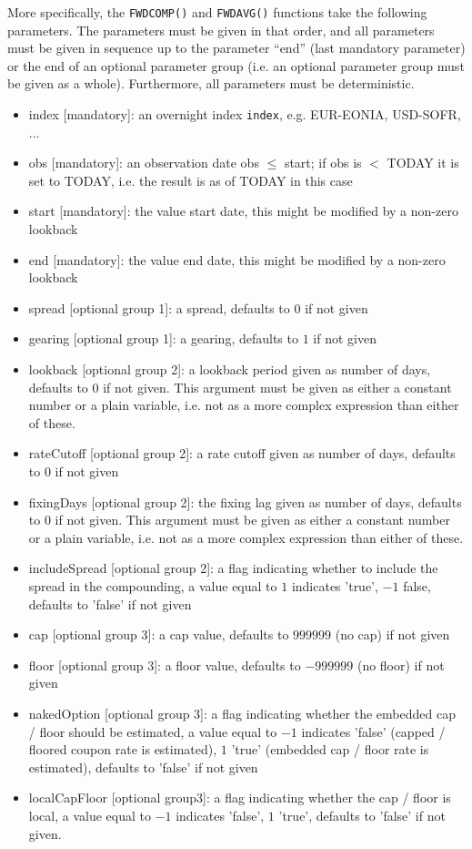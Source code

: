 More specifically, the {\tt FWDCOMP()} and {\tt FWDAVG()} functions take the following parameters. The parameters must
be given in that order, and all parameters must be given in sequence up to the parameter ``end'' (last mandatory
parameter) or the end of an optional parameter group (i.e. an optional parameter group must be given as a
whole). Furthermore, all parameters must be deterministic.

\begin{itemize}
\item index [mandatory]: an overnight index \verb+index+, e.g. EUR-EONIA, USD-SOFR, ...
\item obs [mandatory]: an observation date obs $\leq$ start; if obs is $<$ TODAY it is set to TODAY, i.e. the result is
  as of TODAY in this case
\item start [mandatory]: the value start date, this might be modified by a non-zero lookback
\item end [mandatory]: the value end date, this might be modified by a non-zero lookback
\item spread [optional group 1]: a spread, defaults to $0$ if not given
\item gearing [optional group 1]: a gearing, defaults to $1$ if not given
\item lookback [optional group 2]: a lookback period given as number of days, defaults to $0$ if not given. This
  argument must be given as either a constant number or a plain variable, i.e. not as a more complex expression than
  either of these.
\item rateCutoff [optional group 2]: a rate cutoff given as number of days, defaults to $0$ if not given
\item fixingDays [optional group 2]: the fixing lag given as number of days, defaults to $0$ if not given. This argument
  must be given as either a constant number or a plain variable, i.e. not as a more complex expression than either of
  these.
\item includeSpread [optional group 2]: a flag indicating whether to include the spread in the compounding, a value equal to $1$ indicates 'true', $-1$ false, defaults to 'false' if not given
\item cap [optional group 3]: a cap value, defaults to $999999$ (no cap) if not given
\item floor [optional group 3]: a floor value, defaults to $-999999$ (no floor) if not given
\item nakedOption [optional group 3]: a flag indicating whether the embedded cap / floor should be estimated, a value equal to $-1$ indicates 'false' (capped / floored coupon rate is estimated), $1$ 'true' (embedded cap / floor rate is estimated), defaults to 'false' if not given
\item localCapFloor [optional group3]: a flag indicating whether the cap / floor is local, a value equal to $-1$ indicates 'false', $1$ 'true', defaults to 'false' if not given.
\end{itemize}


